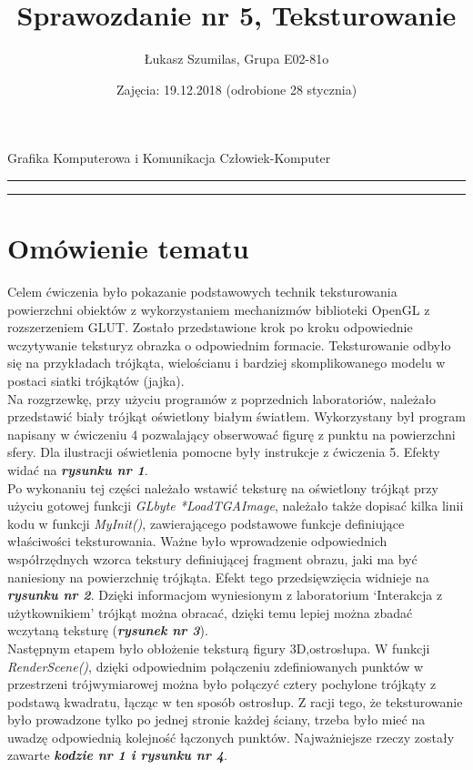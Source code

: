 \documentclass[polish,polish,a4paper]{article}
\title{Sprawozdanie nr 5, Teksturowanie}
\author{Łukasz Szumilas, Grupa E02-81o}
\date{Zajęcia: 19.12.2018 (odrobione 28 stycznia)}
\begin{document}
  \begin{center}\Large
    Grafika Komputerowa i Komunikacja Człowiek-Komputer
  \end{center}
  \hrule
  {\let\newpage\relax\maketitle}
  \hrule


  \section{Omówienie tematu}
  Celem ćwiczenia było pokazanie podstawowych technik teksturowania powierzchni obiektów z wykorzystaniem mechanizmów biblioteki OpenGL z rozszerzeniem GLUT. Zostało przedstawione krok po kroku odpowiednie wczytywanie teksturyz obrazka o odpowiednim formacie. Teksturowanie odbyło się na przykładach trójkąta, wielościanu i  bardziej skomplikowanego modelu w postaci siatki trójkątów (jajka).
\\\indent Na rozgrzewkę, przy użyciu programów z poprzednich laboratoriów, należało przedstawić biały trójkąt oświetlony białym światłem. Wykorzystany był program napisany w ćwiczeniu 4  pozwalający obserwować figurę z punktu na powierzchni sfery. Dla ilustracji 
oświetlenia pomocne były instrukcje z ćwiczenia 5.  Efekty widać na \textbf{\textit{rysunku nr 1}}.
\\\indent Po wykonaniu tej części należało wstawić teksturę na oświetlony trójkąt przy użyciu gotowej funkcji \textit{GLbyte *LoadTGAImage}, należało także dopisać kilka linii kodu w funkcji \textit{MyInit()}, zawierającego podstawowe funkcje definiujące właściwości teksturowania. Ważne było wprowadzenie odpowiednich współrzędnych wzorca tekstury definiującej fragment obrazu, jaki ma być naniesiony na powierzchnię trójkąta. Efekt tego przedsięwzięcia widnieje na \textbf{\textit{rysunku nr 2}}. Dzięki informacjom wyniesionym z laboratorium `Interakcja z użytkownikiem' trójkąt można obracać, dzięki temu lepiej można zbadać wczytaną teksturę (\textbf{\textit{rysunek nr 3}}). 
\\\indent Następnym etapem było obłożenie teksturą figury 3D,ostrosłupa. W funkcji \textit{RenderScene()}, dzięki odpowiednim połączeniu zdefiniowanych punktów w przestrzeni trójwymiarowej  można było połączyć cztery pochylone trójkąty z podstawą kwadratu, łącząc w ten sposób ostrosłup. Z racji tego, że teksturowanie było prowadzone tylko po jednej stronie każdej ściany, trzeba było mieć na uwadzę odpowiednią kolejność łączonych punktów. Najważniejsze rzeczy zostały zawarte \textbf{\textit{kodzie nr 1 i rysunku nr 4}}.
\end{document}
